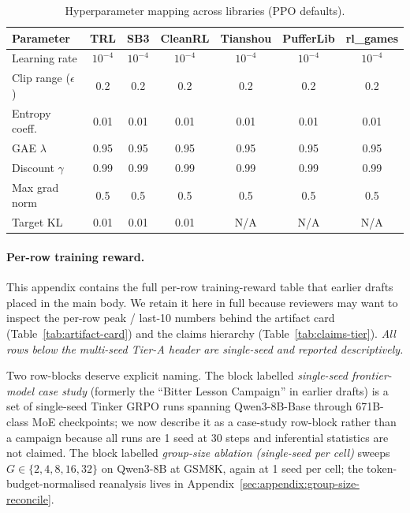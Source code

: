 \documentclass{article}
\begin{document}
\begin{table}[ht]
\centering
\caption{Hyperparameter mapping across libraries (PPO defaults).}
\label{tab:hyperparams}
\small
\setlength{\tabcolsep}{4pt}
\begin{tabular}{lcccccc}
\toprule
\textbf{Parameter} & \textbf{TRL} & \textbf{SB3} & \textbf{CleanRL} & \textbf{Tianshou} & \textbf{PufferLib} & \textbf{rl\_games} \\
\midrule
Learning rate & $10^{-4}$ & $10^{-4}$ & $10^{-4}$ & $10^{-4}$ & $10^{-4}$ & $10^{-4}$ \\
Clip range ($\epsilon$) & 0.2 & 0.2 & 0.2 & 0.2 & 0.2 & 0.2 \\
Entropy coeff. & 0.01 & 0.01 & 0.01 & 0.01 & 0.01 & 0.01 \\
GAE $\lambda$ & 0.95 & 0.95 & 0.95 & 0.95 & 0.95 & 0.95 \\
Discount $\gamma$ & 0.99 & 0.99 & 0.99 & 0.99 & 0.99 & 0.99 \\
Max grad norm & 0.5 & 0.5 & 0.5 & 0.5 & 0.5 & 0.5 \\
Target KL & 0.01 & 0.01 & 0.01 & N/A & N/A & N/A \\
\bottomrule
\end{tabular}
\end{table}

\paragraph{Per-row training reward.}
This appendix contains the full per-row training-reward table that earlier
drafts placed in the main body. We retain it here in full because reviewers
may want to inspect the per-row peak / last-10 numbers behind the artifact
card (Table~\ref{tab:artifact-card}) and the claims hierarchy
(Table~\ref{tab:claims-tier}). \emph{All rows below the multi-seed Tier-A
header are single-seed and reported descriptively.}

Two row-blocks deserve explicit naming. The block labelled
\textit{single-seed frontier-model case study} (formerly the ``Bitter
Lesson Campaign'' in earlier drafts) is a set of single-seed Tinker GRPO
runs spanning Qwen3-8B-Base through 671B-class MoE checkpoints; we now
describe it as a case-study row-block rather than a campaign because all
runs are 1 seed at 30 steps and inferential statistics are not claimed.
The block labelled \textit{group-size ablation (single-seed per cell)}
sweeps $G \in \{2,4,8,16,32\}$ on Qwen3-8B at GSM8K, again at 1 seed per
cell; the token-budget-normalised reanalysis lives in
Appendix~\ref{sec:appendix:group-size-reconcile}.
\end{document}
